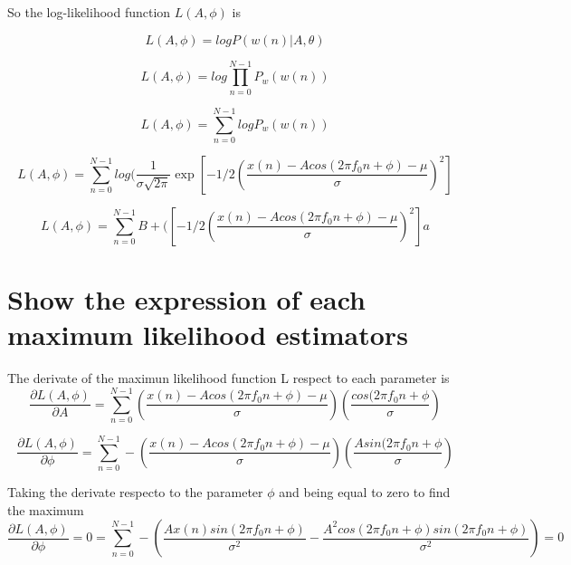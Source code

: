 \documentclass{report}
\begin{document}
So the log-likelihood function $L(A,\phi)$ is 

\begin{equation}\label{key}
L(A,\phi) = log P(w(n)|A,\theta )
\end{equation}

\begin{equation}\label{key}
L(A,\phi) = log \prod_{n=0}^{N-1} P_w(w(n))
\end{equation}

\begin{equation}\label{key}
L(A,\phi) = \sum_{n=0}^{N-1} log P_w(w(n))
\end{equation}

\begin{equation}\label{key}
L(A,\phi) = \sum_{n=0}^{N-1} log(\frac{1}{\sigma \sqrt{2\pi}}\exp{[-1/2(\frac{x(n) - A cos (2\pi f_0 n + \phi)-\mu}{\sigma})^2]}
\end{equation}

\begin{equation}\label{key}
L(A,\phi) = \sum_{n=0}^{N-1} B + ({[-1/2(\frac{x(n) - A cos (2\pi f_0 n + \phi)-\mu}{\sigma})^2]}a
\end{equation}

\section{Show the expression of each maximum likelihood estimators }
The derivate of the maximun likelihood function L respect to 
each parameter is
\begin{equation}\label{key}
\frac{\partial L(A,\phi)}{\partial A} = \sum_{n=0}^{N-1} (\frac{x(n) - A cos (2\pi f_0 n + \phi)-\mu}{\sigma})(\frac{cos(2\pi f_0 n +\phi}{\sigma})
\end{equation}

\begin{equation}\label{key}
\frac{\partial L(A,\phi)}{\partial \phi} = \sum_{n=0}^{N-1} - (\frac{x(n) - A cos (2\pi f_0 n + \phi)-\mu}{\sigma})(\frac{Asin(2\pi f_0 n +\phi}{\sigma})
\end{equation}

Taking the derivate respecto to the parameter $\phi $ and being equal to zero to find the maximum
\begin{equation}\label{key}
\frac{\partial L(A,\phi)}{\partial \phi} = 0 = \sum_{n=0}^{N-1} - (\frac{Ax(n)sin(2\pi f_0 n +\phi)}{\sigma^2}-\frac{A^2cos(2\pi f_0 n +\phi)sin(2\pi f_0 n +\phi)}{\sigma^2}) = 0
\end{equation}
\end{document}
